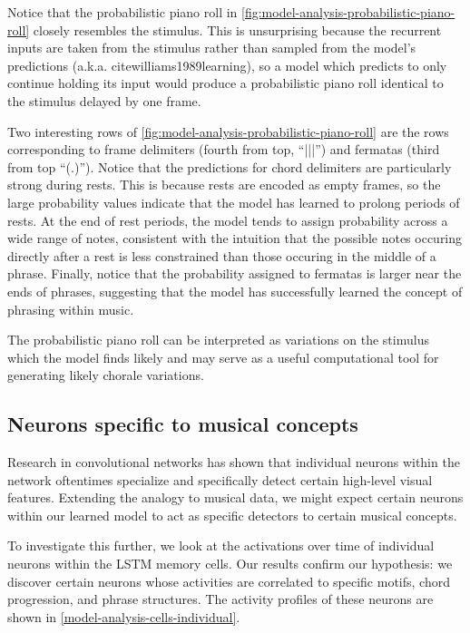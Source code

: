 \documentclass[dissertation.tex]{subfiles}
\begin{document}
Notice that the probabilistic piano roll in
\autoref{fig:model-analysis-probabilistic-piano-roll} closely resembles the
stimulus. This is unsurprising because the recurrent inputs are taken from the
stimulus rather than sampled from the model's predictions (a.k.a.
cite{williams1989learning}), so a model which predicts to only continue holding
its input would produce a probabilistic piano roll identical to the stimulus
delayed by one frame.

Two interesting rows of \autoref{fig:model-analysis-probabilistic-piano-roll}
are the rows corresponding to frame delimiters (fourth from top, ``|||'') and
fermatas (third from top ``(.)''). Notice that the predictions for chord
delimiters are particularly strong during rests. This is because rests are
encoded as empty frames, so the large probability values indicate that the
model has learned to prolong periods of rests. At the end of rest periods, the
model tends to assign probability across a wide range of notes, consistent with
the intuition that the possible notes occuring directly after a rest is less
constrained than  those occuring in the middle of a
phrase. Finally, notice that the probability assigned to fermatas is larger
near the ends of phrases, suggesting that the model has successfully learned
the concept of phrasing within music.

The probabilistic piano roll can be interpreted as variations on the stimulus
which the model finds likely and may serve as a useful computational tool for
generating likely chorale variations.

\subsection{Neurons specific to musical concepts}

Research in convolutional networks has shown that individual neurons within the
network oftentimes specialize and specifically detect certain high-level visual
features. Extending the analogy to musical data, we
might expect certain neurons within our learned model to act as specific
detectors to certain musical concepts.

To investigate this further, we look at the activations over time of individual
neurons within the LSTM memory cells. Our results confirm our hypothesis: we
discover certain neurons whose activities are correlated to specific motifs,
chord progression, and phrase structures. The activity profiles of these
neurons are shown in \autoref{model-analysis-cells-individual}.
\end{document}
